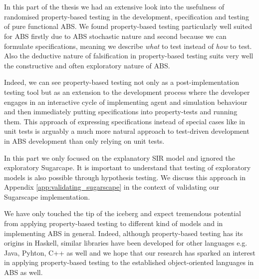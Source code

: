 \chapter*{}
In this part of the thesis we had an extensive look into the usefulness of randomised property-based testing in the development, specification and testing of pure functional ABS. We found property-based testing particularly well suited for ABS firstly due to ABS stochastic nature and second because we can formulate specifications, meaning we describe \textit{what} to test instead of \textit{how} to test. Also the deductive nature of falsification in property-based testing suits very well the constructive and often exploratory nature of ABS. 

Indeed, we can see property-based testing not only as a post-implementation testing tool but as an extension to the development process where the developer engages in an interactive cycle of implementing agent and simulation behaviour and then immediately putting specifications into property-tests and running them. This approach of expressing specifications instead of special cases like in unit tests is arguably a much more natural approach to test-driven development in ABS development than only relying on unit tests.

In this part we only focused on the explanatory SIR model and ignored the exploratory Sugarcape. It is important to understand that testing of exploratory models is also possible through hypothesis testing. We discuss this approach in Appendix \ref{app:validating_sugarscape} in the context of validating our Sugarscape implementation.

We have only touched the tip of the iceberg and expect tremendous potential from applying property-based testing to different kind of models and in implementing ABS in general. Indeed, although property-based testing has its origins in Haskell, similar libraries have been developed for other languages e.g. Java, Pyhton, C++ as well and we hope that our research has sparked an interest in applying property-based testing to the established object-oriented languages in ABS as well.
